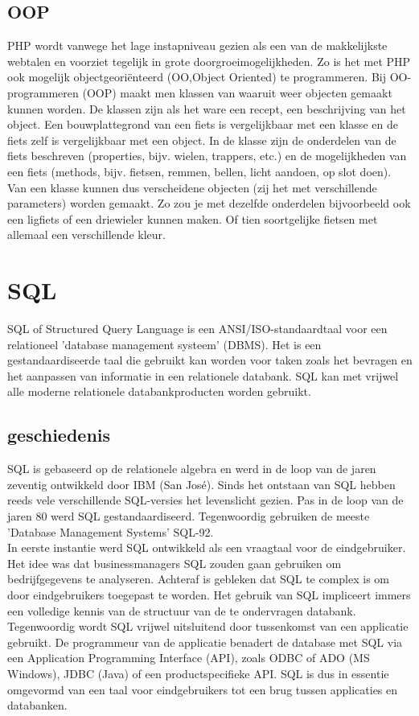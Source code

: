 \subsection{OOP }
PHP wordt vanwege het lage instapniveau gezien als een van de makkelijkste webtalen en voorziet tegelijk in grote 
doorgroeimogelijkheden. Zo is het met PHP ook mogelijk objectgeori\"enteerd (OO,Object Oriented) te programmeren. 
Bij OO-programmeren (OOP) maakt men klassen van waaruit weer objecten gemaakt kunnen worden. De klassen zijn als het ware 
een recept, een beschrijving van het object. Een bouwplattegrond van een fiets is vergelijkbaar met een klasse en de fiets 
zelf is vergelijkbaar met een object. In de klasse zijn de onderdelen van de fiets beschreven (properties, bijv. wielen, 
trappers, etc.) en de mogelijkheden van een fiets (methods, bijv. fietsen, remmen, bellen, licht aandoen, op slot doen). 
Van een klasse kunnen dus verscheidene objecten (zij het met verschillende parameters) worden gemaakt. Zo zou je met 
dezelfde onderdelen bijvoorbeeld ook een ligfiets of een driewieler kunnen maken. Of tien soortgelijke fietsen met 
allemaal een verschillende kleur.

\section{SQL}
SQL  of Structured Query Language is een ANSI/ISO-standaardtaal voor
een relationeel 'database management systeem' (DBMS). Het is een gestandaardiseerde taal die gebruikt kan worden 
voor taken zoals het bevragen en het aanpassen van informatie in een relationele databank. SQL kan met vrijwel 
alle moderne relationele databankproducten worden gebruikt.

\subsection{geschiedenis}
SQL is gebaseerd op de relationele algebra en werd in de loop van de jaren
zeventig ontwikkeld door IBM (San Jos\'e). Sinds het ontstaan van SQL hebben
reeds vele verschillende SQL-versies het levenslicht gezien. Pas in de loop van de jaren 80 werd SQL gestandaardiseerd. Tegenwoordig gebruiken de meeste 
'Database Management Systems' SQL-92.
\\
In eerste instantie werd SQL ontwikkeld als een vraagtaal voor de eindgebruiker.
Het idee was dat businessmanagers SQL zouden gaan gebruiken om bedrijfgegevens te analyseren. 
Achteraf is gebleken dat SQL te complex is om door eindgebruikers toegepast te worden. 
Het gebruik van SQL impliceert immers een volledige kennis van de structuur van de te ondervragen databank. 
Tegenwoordig wordt SQL vrijwel uitsluitend door tussenkomst van een applicatie gebruikt. De programmeur van 
de applicatie benadert de database met SQL via een Application Programming Interface (API), zoals ODBC of 
ADO (MS Windows), JDBC (Java) of een productspecifieke API. SQL is dus in essentie omgevormd van een taal voor 
eindgebruikers tot een brug tussen applicaties en databanken.
